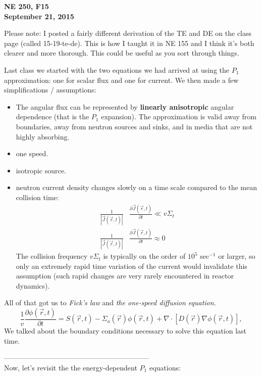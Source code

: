 \documentclass[12pt]{article}
\newcommand{\rvec}{\ensuremath{\vec{r}}}
\begin{document}
\begin{center}
{\bf NE 250, F15 \\
September 21, 2015}
\end{center}

Please note: I posted a fairly different derivation of the TE and DE on the class page (called 15-19-te-de). This is how I taught it in NE 155 and I think it's both clearer and more thorough. This could be useful as you sort through things. 

Last class we started with the two equations we had arrived at using the $P_1$ approximation: one for scalar flux and one for current. We then made a few simplifications / assumptions:
\begin{itemize}
\item The angular flux can be represented by \textbf{linearly anisotropic} angular dependence (that is the $P_1$ expansion). 
The approximation is valid away from boundaries, away from neutron sources and sinks, and in media that are not highly absorbing.
\item one speed.
\item isotropic source.
\item neutron current density changes slowly on a time scale compared to the mean collision time:
\begin{align*}
\frac{1}{|\vec{J}(\rvec,t)|}&\frac{\partial\vec{J}(\rvec,t)}{\partial t} \ll v\Sigma_t \\ \frac{1}{|\vec{J}(\rvec,t)|}&\frac{\partial\vec{J}(\rvec,t)}{\partial t}\approx 0
\end{align*}
The collision frequency $v\Sigma_t$ is typically on the order of $10^5$ sec$^{-1}$ or larger, so only an extremely rapid time variation of the current would invalidate this assumption (such rapid changes are very rarely encountered in reactor dynamics).
\end{itemize}

All of that got us to \textit{Fick's law} and \textit{the one-speed diffusion equation}.  
%
\begin{equation*}
\frac{1}{v}\frac{\partial\phi(\rvec,t)}{\partial t} = S(\rvec,t) - \Sigma_a(\rvec)\phi(\rvec,t) + 
\nabla\cdot[D(\rvec)\nabla\phi(\rvec,t)],
\end{equation*}
%
We talked about the boundary conditions necessary to solve this equation last time. 

--------------------------------------------------------------\\
Now, let's revisit the the energy-dependent $P_1$ equations:
\end{document}
